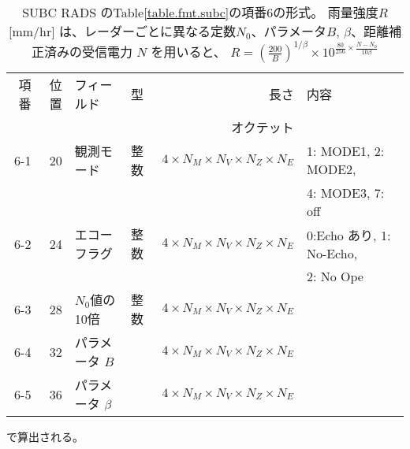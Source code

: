 \begin{table}[htp]
 \begin{center}
  \begin{tabular}{rr|llrl}
 \hline
 項番 & 位置 & フィールド & 型 & 長さ & 内容 \\
      &      &            & \multicolumn{2}{r}{オクテット} &  \\
 \hline
   6-1 & 20 &観測モード & 整数 
   & $4\times N_M \times N_V \times N_Z \times N_E$ & 
   1: MODE1, 2: MODE2, \\
       &  &  &  &  & 4: MODE3, 7: off \\
   6-2 & 24 &エコーフラグ & 整数 
   & $4\times N_M \times N_V \times N_Z \times N_E$ & 
   0:Echo あり, 1: No-Echo, \\
       &  &  &  &  & 2: No Ope \\
   6-3 & 28 & $N_0$値の10倍 & 整数 
      & $4\times N_M \times N_V \times N_Z \times N_E$ &  \\
   6-4 & 32 & パラメータ $B$ &  
      & $4\times N_M \times N_V \times N_Z \times N_E$ &  \\
   6-5 & 36 & パラメータ $\beta$ &  
      & $4\times N_M \times N_V \times N_Z \times N_E$ &  \\
   \hline
  \end{tabular}
 \end{center}
 \caption{SUBC RADS のTable\ref{table.fmt.subc}の項番6の形式。
 雨量強度$R$[mm/hr] は、レーダーごとに異なる定数$N_0$、パラメータ$B$,
 $\beta$、距離補正済みの受信電力 $N$ を用いると、
 $R=\left(\frac{200}{B}\right)^{1/\beta}
 \times 10 ^{\frac{80}{256}\times \frac{N-N_0}{10\beta}}$}
 で算出される。
 \label{table.fmt.subc.rads}
\end{table}

